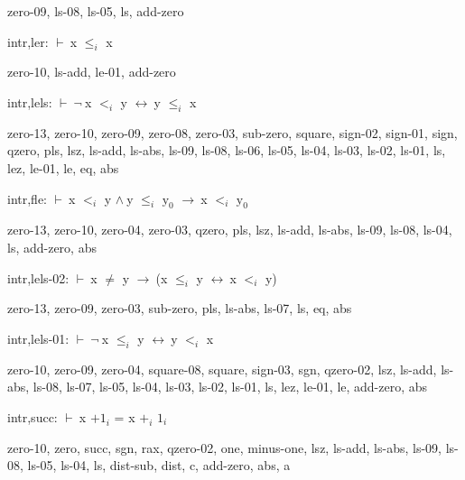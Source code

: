 \documentclass[a4paper]{article}
\newcommand{\Fol}{\mbox{$\vdash\ $}}
\newcommand{\Not}{\mbox{$\neg\ $}}
\newcommand{\And}{\mbox{$\wedge\ $}}
\newcommand{\Imp}{\mbox{$\rightarrow\ $}}
\newcommand{\Equiv}{\mbox{$\leftrightarrow\ $}}
\begin{document}
zero-09, ls-08, ls-05, ls, add-zero

\bigskip

intr,ler: 
 \Fol x $\mbox{$\le$}_{i}$ x



zero-10, ls-add, le-01, add-zero

\bigskip

intr,lels: 
 \Fol \Not x $\mbox{$<$}_{i}$ y \Equiv y $\mbox{$\le$}_{i}$ x



zero-13, zero-10, zero-09, zero-08, zero-03, sub-zero, square, sign-02, sign-01, sign, qzero, pls, lsz, ls-add, ls-abs, ls-09, ls-08, ls-06, ls-05, ls-04, ls-03, ls-02, ls-01, ls, lez, le-01, le, eq, abs

\bigskip

intr,fle: 
 \Fol x $\mbox{$<$}_{i}$ y \And y $\mbox{$\le$}_{i}$ $\mbox{y}_{0}$ \Imp x $\mbox{$<$}_{i}$ $\mbox{y}_{0}$



zero-13, zero-10, zero-04, zero-03, qzero, pls, lsz, ls-add, ls-abs, ls-09, ls-08, ls-04, ls, add-zero, abs

\bigskip

intr,lels-02: 
 \Fol x $\neq$ y \Imp (x $\mbox{$\le$}_{i}$ y \Equiv x $\mbox{$<$}_{i}$ y)



zero-13, zero-09, zero-03, sub-zero, pls, ls-abs, ls-07, ls, eq, abs

\bigskip

intr,lels-01: 
 \Fol \Not x $\mbox{$\le$}_{i}$ y \Equiv y $\mbox{$<$}_{i}$ x



zero-10, zero-09, zero-04, square-08, square, sign-03, sgn, qzero-02, lsz, ls-add, ls-abs, ls-08, ls-07, ls-05, ls-04, ls-03, ls-02, ls-01, ls, lez, le-01, le, add-zero, abs

\bigskip

intr,succ: 
 \Fol x $\mbox{+1}_{i}$ = x $\mbox{+}_{i}$ $\mbox{1}_{i}$



zero-10, zero, succ, sgn, rax, qzero-02, one, minus-one, lsz, ls-add, ls-abs, ls-09, ls-08, ls-05, ls-04, ls, dist-sub, dist, c, add-zero, abs, a

\bigskip
\end{document}
